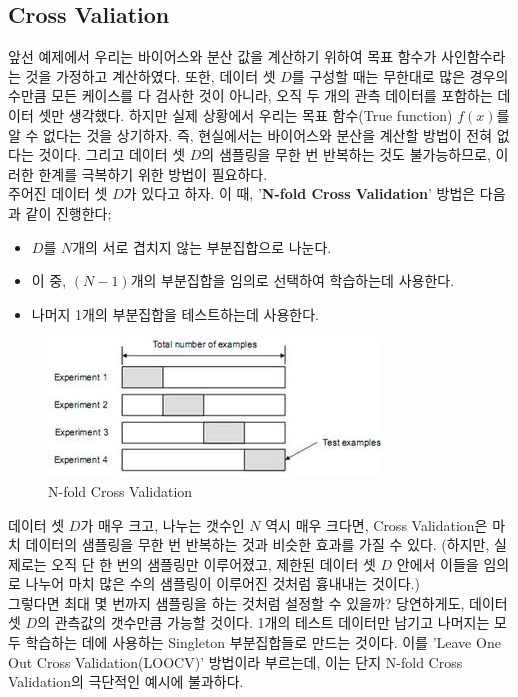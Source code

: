 \documentclass[a4paper]{oblivoir}
\begin{document}
\subsection{Cross Valiation}
앞선 예제에서 우리는 바이어스와 분산 값을 계산하기 위하여 목표 함수가 사인함수라는 것을 가정하고 계산하였다. 또한, 데이터 셋 $D$를 구성할 때는 무한대로 많은 경우의 수만큼 모든 케이스를 다 검사한 것이 아니라, 오직 두 개의 관측 데이터를 포함하는 데이터 셋만 생각했다. 하지만 실제 상황에서 우리는 목표 함수(True function) $f(x)$를 알 수 없다는 것을 상기하자. 즉, 현실에서는 바이어스와 분산을 계산할 방법이 전혀 없다는 것이다. 그리고 데이터 셋 $D$의 샘플링을 무한 번 반복하는 것도 불가능하므로, 이러한 한계를 극복하기 위한 방법이 필요하다. \\
\indent 주어진 데이터 셋 $D$가 있다고 하자. 이 때, '\textbf{N-fold Cross Validation}' 방법은 다음과 같이 진행한다;
\begin{itemize}
\item $D$를 $N$개의 서로 겹치지 않는 부분집합으로 나눈다.
\item 이 중, $(N-1)$개의 부분집합을 임의로 선택하여 학습하는데 사용한다.
\item 나머지 1개의 부분집합을 테스트하는데 사용한다.
\end{itemize}
\begin{figure}[ht]
\centering
\includegraphics[scale=0.65]{Cross_Validation.png}
\caption{N-fold Cross Validation}
\label{Figure 6-6}
\end{figure}

\indent 데이터 셋 $D$가 매우 크고, 나누는 갯수인 $N$ 역시 매우 크다면, Cross Validation은 마치 데이터의 샘플링을 무한 번 반복하는 것과 비슷한 효과를 가질 수 있다. (하지만, 실제로는 오직 단 한 번의 샘플링만 이루어졌고, 제한된 데이터 셋 $D$ 안에서 이들을 임의로 나누어 마치 많은 수의 샘플링이 이루어진 것처럼 흉내내는 것이다.)  \\
\indent 그렇다면 최대 몇 번까지 샘플링을 하는 것처럼 설정할 수 있을까? 당연하게도, 데이터 셋 $D$의 관측값의 갯수만큼 가능할 것이다. 1개의 테스트 데이터만 남기고 나머지는 모두 학습하는 데에 사용하는 Singleton 부분집합들로 만드는 것이다. 이를 'Leave One Out Cross Validation(LOOCV)' 방법이라 부르는데, 이는 단지 N-fold Cross Validation의 극단적인 예시에 불과하다.
\end{document}

